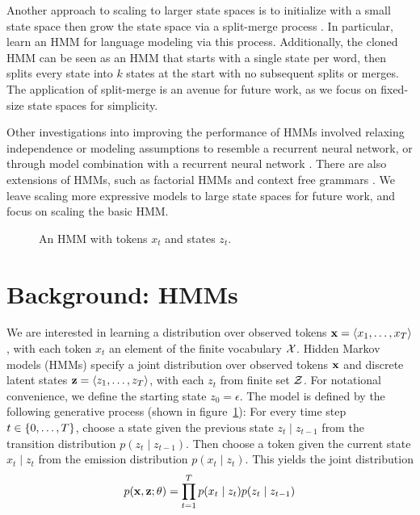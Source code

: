 \documentclass[11pt,a4paper]{article}
\begin{document}
Another approach to scaling to larger state spaces is to initialize
with a small state space then grow the state space via a split-merge process
\citep{petrov2006splitmerge,huang2011thesis}.
In particular, \citet{huang2011thesis} learn an HMM for language modeling
via this process.
Additionally, the cloned HMM \citep{dedieu2019learning} can be seen
as an HMM that starts with a single state per word,
then splits every state into $k$ states at the start
with no subsequent splits or merges.
The application of split-merge is an avenue for future work,
as we focus on fixed-size state spaces for simplicity.

Other investigations into improving the performance of HMMs
involved relaxing independence or modeling assumptions \citep{buys2018hmm}
to resemble a recurrent neural network, or through model combination
with a recurrent neural network \citep{krakovna2016hmm}.
There are also extensions of HMMs, such as factorial HMMs \cite{zoubin1997fhmm,nepal2013fhmm}
and context free grammars \citep{kim2019cpcfg}.
We leave scaling more expressive models to large state spaces for future work,
and focus on scaling the basic HMM.

\begin{figure}[t]
\centering
{}

\caption{
\label{fig:hmm}
An HMM with tokens $x_t$ and states $z_t$.
}
\end{figure}


\section{Background: HMMs}
We are interested in learning a distribution over observed tokens
$\mathbf{x} = \langle x_1, \ldots, x_T \rangle$, with each token $x_t$
an element of the finite vocabulary $\mathcal{X}$.
Hidden Markov models (HMMs) specify a joint distribution over 
observed tokens $\mathbf{x}$ and discrete latent states $\mathbf{z} = \langle z_1, \ldots, z_T \rangle$,
with each $z_t$ from finite set $\mathcal{Z}$.
For notational convenience, we define the starting state $z_0=\epsilon$.
The model is defined by the following generative process (shown in figure~\ref{fig:hmm}):
For every time step $t \in \left\{0,\ldots,T\right\}$, choose a state given the previous state
$z_t \mid z_{t-1}$ from the transition distribution $p(z_t \mid z_{t-1})$.
Then choose a token given the current state $x_t \mid z_t$
from the emission distribution $p(x_t \mid z_t)$.
This yields the joint distribution
\begin{equation}
p(\mathbf{x}, \mathbf{z}; \theta)
= \prod_{t=1}^T p(x_t\mid z_t)p(z_t \mid z_{t-1})
\end{equation}
\end{document}

